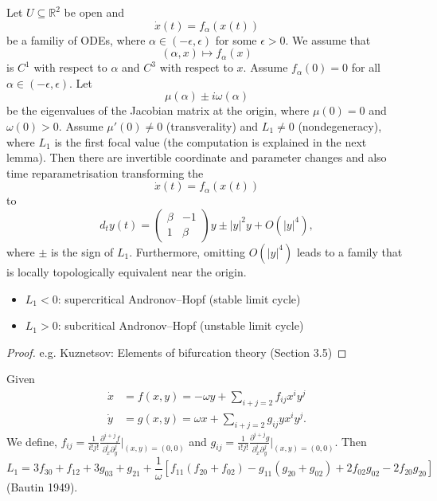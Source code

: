 \documentclass{article}
\newcommand*{\R}{\mathbb{R}}
\newcommand*{\reci}[1]{{\frac{1}{#1}}}
\newcommand*{\mattwo}[4]{\begin{pmatrix}
    #1&#2\\#3&#4
\end{pmatrix}}
\begin{document}
\begin{thm}
    Let $U \subseteq \R^2$ be open and
    $$\dot x(t) = f_\alpha(x(t))$$
    be a familiy of ODEs, where $\alpha \in (-\epsilon, \epsilon)$ for some $\epsilon > 0$. We assume that
    $$(\alpha,x) \mapsto f_\alpha(x)$$
    is $C^1$ with respect to $\alpha$ and  $C^3$ with respect to $x$. Assume $f_\alpha(0) = 0$ for all $\alpha \in (-\epsilon, \epsilon)$. Let
    $$\mu(\alpha)\pm i\omega(\alpha)$$
    be the eigenvalues of the Jacobian matrix at the origin,
    where $\mu(0)=0$ and $\omega(0) > 0$.
    Assume $\mu'(0)\neq 0$ (transverality) and $L_1\neq 0$ (nondegeneracy), where $L_1$ is the first focal value (the computation is explained in the next lemma). Then there are invertible coordinate and parameter changes and also time reparametrisation transforming the
    $$\dot x(t)=f_\alpha(x(t))$$
    to
    $$d_t y(t)=\mattwo{\beta}{-1}{1}{\beta}y\pm|y|^2y+O(|y|^4),$$ where $\pm$ is the sign of $L_1$. Furthermore, omitting $O(|y|^4)$ leads to a family that is locally topologically equivalent near the origin.
    \begin{itemize}
        \item $L_1<0$: supercritical Andronov--Hopf (stable limit cycle)

        \item $L_1>0$: subcritical Andronov--Hopf (unstable limit cycle)
    \end{itemize}
\end{thm}

\begin{proof}
    e.g. Kuznetsov: Elements of bifurcation theory (Section 3.5)
\end{proof}

\begin{lem}
    Given
    $$\begin{aligned}
        \dot x &= f(x,y)=-\omega y+\sum_{i+j=2} f_{ij}x^iy^j\\
        \dot y &= g(x,y)=\omega x+\sum_{i+j=2} g_{ij}yx^iy^j.
    \end{aligned}$$
    We define, $f_{ij}=\frac{1}{i!j!}\frac{\partial^{i+j}f}{\partial_x^i \partial_y^j}\Big|_{(x,y)=(0,0)}$ and $g_{ij}=\frac{1}{i!j!}\frac{\partial^{i+j}g}{\partial_x^i \partial_y^j}\Big|_{(x,y)=(0,0)}$.
    Then
    $$L_1 = 3f_{30}+f_{12}+3g_{03}+g_{21}+\reci{\omega}[f_{11}(f_{20}+f_{02})-g_{11}(g_{20}+g_{02})+2f_{02}g_{02}-2f_{20}g_{20}]$$
    (Bautin 1949).
\end{lem}
\end{document}
